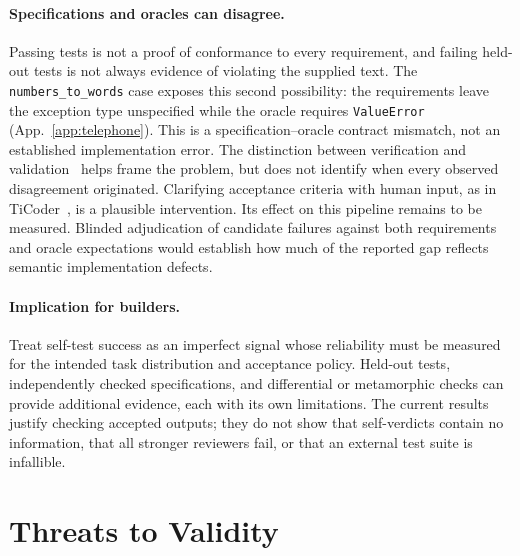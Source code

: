 \paragraph{Specifications and oracles can disagree.} Passing tests is not a proof of conformance
to every requirement, and failing held-out tests is not always evidence of violating the supplied
text. The \texttt{numbers\_to\_words} case exposes this second possibility: the requirements leave
the exception type unspecified while the oracle requires \texttt{ValueError}
(App.~\ref{app:telephone}). This is a specification--oracle contract mismatch, not an established
implementation error. The distinction between verification and validation~\cite{boehm1984vv}
helps frame the problem, but does not identify when every observed disagreement originated.
Clarifying acceptance criteria with human input, as in TiCoder~\cite{fakhoury2024ticoder}, is a
plausible intervention. Its effect on this pipeline remains to be measured. Blinded adjudication
of candidate failures against both requirements and oracle expectations would establish how
much of the reported gap reflects semantic implementation defects.

\paragraph{Implication for builders.} Treat self-test success as an imperfect signal whose
reliability must be measured for the intended task distribution and acceptance policy. Held-out
tests, independently checked specifications, and differential or metamorphic checks can provide
additional evidence, each with its own limitations. The current results justify checking
accepted outputs; they do not show that self-verdicts contain no information, that all stronger
reviewers fail, or that an external test suite is infallible.

\section{Threats to Validity}
\label{sec:threats}

